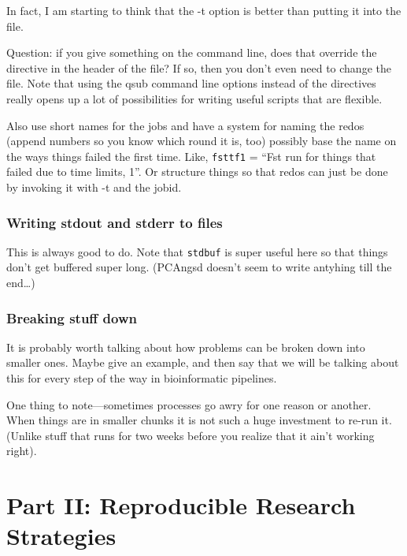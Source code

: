 \documentclass[]{krantz}
\begin{document}
In fact, I am starting to think that the -t option is better than
putting it into the file.

Question: if you give something on the command line, does that override
the directive in the header of the file? If so, then you don't even
need to change the file. Note that using the qsub command line options
instead of the directives really opens up a lot of possibilities for
writing useful scripts that are flexible.

Also use short names for the jobs and have a system for naming the
redos (append numbers so you know which round it is, too)
possibly base the name on the ways things failed the first time. Like,
\texttt{fsttf1} = ``Fst run for things that failed due to time limits, 1''. Or
structure things so that redos can just be done by invoking it with -t
and the jobid.

\hypertarget{writing-stdout-and-stderr-to-files}{%
\section{Writing stdout and stderr to files}\label{writing-stdout-and-stderr-to-files}}

This is always good to do. Note that \texttt{stdbuf} is super useful here so that
things don't get buffered super long. (PCAngsd doesn't seem to write antyhing till
the end\ldots{})

\hypertarget{breaking-stuff-down}{%
\section{Breaking stuff down}\label{breaking-stuff-down}}

It is probably worth talking about how problems can be broken down into
smaller ones. Maybe give an example, and then say that we will be talking about
this for every step of the way in bioinformatic pipelines.

One thing to note---sometimes processes go awry for one reason or another.
When things are in smaller chunks it is not such a huge investment to
re-run it. (Unlike stuff that runs for two weeks before you realize that
it ain't working right).

\hypertarget{part-part-ii-reproducible-research-strategies}{%
\part{Part II: Reproducible Research Strategies}\label{part-part-ii-reproducible-research-strategies}}
\end{document}
